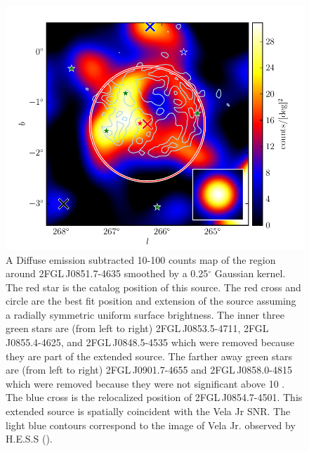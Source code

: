 \documentclass[12pt,preprint]{aastex}
\newcommand{\gev}{\text{GeV}\xspace}
\newcommand{\tev}{\text{TeV}\xspace}
\renewcommand{\deg}{\ensuremath{^\circ}\xspace}
\begin{document}
\begin{figure}
  \begin{center}
    \includegraphics[type=pdf,ext=.pdf,read=.pdf]{source_plots/source_Vela_Jr}
  \end{center}
  \caption{A Diffuse emission subtracted 10-100
  \gev counts map of the region around 2FGL\,J0851.7-4635 smoothed
  by a 0.25\deg Gaussian kernel. The red star is the catalog position of this source.  The red cross
  and circle are the best fit position and extension of the source
  assuming a radially
  symmetric uniform surface brightness.  The inner three green stars
  are (from left to right) 2FGL\,J0853.5-4711, 2FGL\,J0855.4-4625,
  and 2FGL\,J0848.5-4535 which were removed because they are part of
  the extended source.  The farther away green stars are (from left to
  right) 2FGL\,J0901.7-4655 and 2FGL\,J0858.0-4815 which were removed
  because they were not significant above 10 \gev.  The blue cross
  is the relocalized position of 2FGL\,J0854.7-4501.  This extended
  source is spatially coincident with the Vela Jr SNR.  The light
  blue contours correspond to the \tev image of Vela Jr. observed by H.E.S.S
  (\cite{vela_jr_hess}).  
  }\label{Vela_Jr}
\end{figure}
\end{document}
